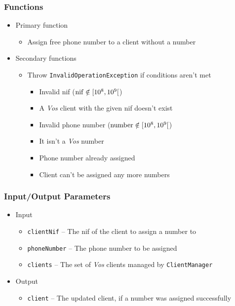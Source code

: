 \subsubsection{Functions}
\label{sec:methods.assignPhoneNumber.functions}
\begin{itemize}
  \item Primary function
  \begin{itemize}
    \small
    \item Assign free phone number to a client without a number
  \end{itemize}
  \item Secondary functions
  \begin{itemize}
    \small
    \item Throw \texttt{InvalidOperationException} if conditions aren't met
      \begin{itemize}
        \footnotesize
        \item Invalid nif ($\rm{nif} \notin [10^8,10^9[$)
        \item A \textit{Vos} client with the given nif doesn't exist
        \item Invalid phone number ($\rm{number} \notin [10^8,10^9[$)
        \item It isn't a \textit{Vos} number
        \item Phone number already assigned
        \item Client can't be assigned any more numbers
      \end{itemize}
  \end{itemize}
\end{itemize}

\subsubsection{Input/Output Parameters}
\label{sec:methods.assignPhoneNumber.params}
\begin{itemize}
  \normalsize
  \item Input
  \begin{itemize}
    \small
    \item \texttt{clientNif} -- The nif of the client to assign a number to
    \item \texttt{phoneNumber} -- The phone number to be assigned
    \item \texttt{clients} -- The set of \textit{Vos} clients managed by
          \texttt{ClientManager}
  \end{itemize}
  \item Output
  \begin{itemize}
    \normalsize
    \item \texttt{client} -- The updated client, if a number was assigned
          successfully
  \end{itemize}
\end{itemize}

